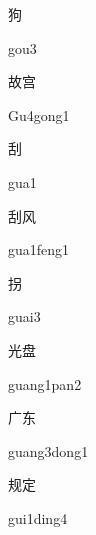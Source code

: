 \begin{multicols*}{2}
\begin{verbete}[gou3]{狗}
\begin{pronuncia}{gou3}
\end{pronuncia}
\end{verbete}

\begin{verbete}[Gu4gong1]{故宫}
\begin{pronuncia}Gu4gong1{}
\end{pronuncia}
\end{verbete}

\begin{verbete}[gua1]{刮}
\begin{pronuncia}{gua1}
\end{pronuncia}
\end{verbete}

\begin{verbete}{刮风}
\begin{pronuncia}{gua1feng1}
\end{pronuncia}
\end{verbete}

\begin{verbete}[guai3]{拐}
\begin{pronuncia}{guai3}
\end{pronuncia}
\end{verbete}

\begin{verbete}{光盘}
\begin{pronuncia}{guang1pan2}
\end{pronuncia}
\end{verbete}

\begin{verbete}{广东}
\begin{pronuncia}{guang3dong1}
\end{pronuncia}
\end{verbete}

\begin{verbete}{规定}
\begin{pronuncia}{gui1ding4}
\end{pronuncia}
\end{verbete}


\end{multicols*}
